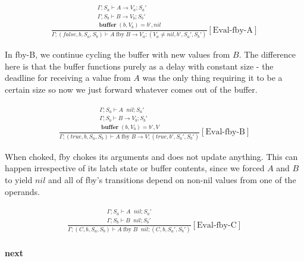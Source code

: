 \documentclass{scrartcl}
\DeclareMathOperator{\fby}{fby}
\DeclareMathOperator{\ceval}{\overset{C}{\rightarrow}}
\DeclareMathOperator{\buffer}{\mathbf{buffer}}
\begin{document}
    \begin{align*}
    \frac{
        \begin{matrix}
        \Gamma; S_a \vdash A \rightarrow V_a; S_a' \\
        \Gamma; S_b \vdash B \rightarrow V_b; S_b' \\
        \buffer(b, V_b) = b', nil
        \end{matrix}
    }{
        \Gamma; (false, b, S_a, S_b) \vdash A \fby B \rightarrow V_a; (V_a \neq nil, b', S_a', S_b')
    }[\text{Eval-fby-A}]
    \end{align*}
    
    In fby-B, we continue cycling the buffer with new values from $B$. The difference here is that the buffer functions purely as a delay with constant size - the deadline for receiving a value from $A$ was the only thing requiring it to be a certain size so now we just forward whatever comes out of the buffer.
    
    \begin{align*}
    \frac{
        \begin{matrix}
        \Gamma; S_a \vdash A \ceval nil; S_a' \\
        \Gamma; S_b \vdash B \rightarrow V_b; S_b' \\
        \buffer(b, V_b) = b', V
        \end{matrix}
    }{
        \Gamma; (true, b, S_a, S_b) \vdash A \fby B \rightarrow V; (true, b', S_a', S_b')
    }[\text{Eval-fby-B}]
    \end{align*}
    
    When choked, fby chokes its arguments and does not update anything. This can happen irrespective of its latch state or buffer contents, since we forced $A$ and $B$ to yield $nil$ and all of fby's transitions depend on non-nil values from one of the operands.
    
    \begin{align*}
    \frac{
        \begin{matrix}
        \Gamma; S_a \vdash A \ceval nil; S_a' \\
        \Gamma; S_b \vdash B \ceval nil; S_b'
        \end{matrix}
    }{
        \Gamma; (C, b, S_a, S_b) \vdash A \fby B \ceval nil; (C, b, S_a', S_b')
    }[\text{Eval-fby-C}]
    \end{align*}
    
    \paragraph{next}
    
\end{document}
